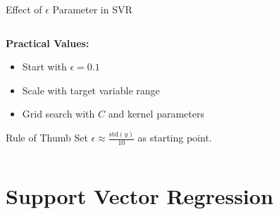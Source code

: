 \documentclass[8pt,aspectratio=1610]{beamer}
\begin{document}
\begin{frame}{Effect of $\epsilon$ Parameter in SVR}
\begin{columns}[t]
\begin{column}{0.48\textwidth}
\vspace{0.3cm}
\textbf{Practical Values:}
\begin{itemize}
\setlength{\itemsep}{1pt}
\item Start with $\epsilon = 0.1$
\item Scale with target variable range
\item Grid search with $C$ and kernel parameters
\end{itemize}

\vspace{0.3cm}
\begin{alertblock}{Rule of Thumb}
Set $\epsilon \approx \frac{\text{std}(y)}{10}$ as starting point.
\end{alertblock}
\end{column}
\end{columns}
\end{frame}

\section{Support Vector Regression}
\end{document}

